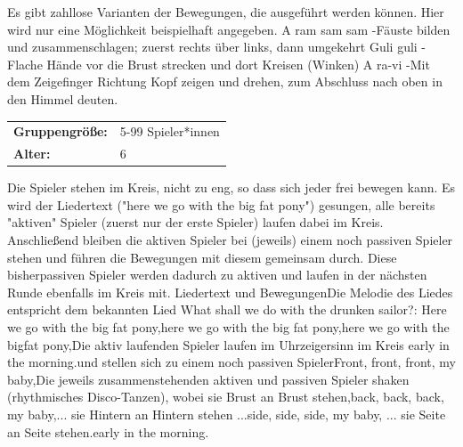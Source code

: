 Es gibt zahllose Varianten der Bewegungen, die ausgeführt werden können. Hier wird nur eine Möglichkeit beispielhaft angegeben.
A ram sam sam -Fäuste bilden und zusammenschlagen; zuerst rechts über links, dann umgekehrt
Guli guli -Flache Hände vor die Brust strecken und dort Kreisen (Winken)
A ra-vi -Mit dem Zeigefinger Richtung Kopf zeigen und drehen, zum Abschluss nach oben in den Himmel deuten.
    \\





\begin{table}[H]
\begin{tabular}{>{\bfseries}lp{8cm}}
   Gruppengröße:   & 5-99 Spieler*innen\\
    Alter: & 6 \\ 
\end{tabular}
\end{table} 
 Die Spieler stehen im Kreis, nicht zu eng, so dass sich jeder frei bewegen kann. Es wird der Liedertext ("here we go with the big fat pony") gesungen, alle bereits "aktiven" Spieler (zuerst nur der erste Spieler) laufen dabei im Kreis. Anschließend bleiben die aktiven Spieler bei (jeweils) einem noch passiven Spieler stehen und führen die Bewegungen mit diesem gemeinsam durch. Diese bisherpassiven Spieler werden dadurch zu aktiven und laufen in der nächsten Runde ebenfalls im Kreis mit.
Liedertext und BewegungenDie Melodie des Liedes entspricht dem bekannten Lied What shall we do with the drunken sailor?:
Here we go with the big fat pony,here we go with the big fat pony,here we go with the bigfat pony,Die aktiv laufenden Spieler laufen im Uhrzeigersinn im Kreis 
early in the morning.und stellen sich zu einem noch passiven SpielerFront, front, front, my baby,Die jeweils zusammenstehenden aktiven und passiven Spieler shaken (rhythmisches Disco-Tanzen), wobei sie Brust an Brust stehen,back, back, back, my baby,... sie Hintern an Hintern stehen ...side, side, side, my baby, ... sie Seite an Seite stehen.early in the morning. \\




